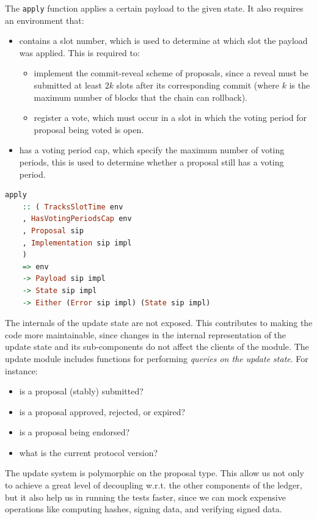 The \lstinline[language=Haskell]!apply! function applies a certain payload to 
the given state. It
also requires an environment that:
\begin{itemize}
	\item contains a slot number, which is used to determine at which slot the
	payload was applied. This is required to:
	\begin{itemize}
		\item implement the commit-reveal scheme of proposals, since a reveal 
		must be
		submitted at least $2k$ slots after its corresponding commit (where $k$ 
		is
		the maximum number of blocks that the chain can rollback).
		\item register a vote, which must occur in a slot in which the voting 
		period
		for proposal being voted is open.
	\end{itemize}
	\item has a voting period cap, which specify the maximum number of voting
	periods, this is used to determine whether a proposal still has a voting
	period.
\end{itemize}

\begin{lstlisting}[language=Haskell]
	apply
	:: ( TracksSlotTime env
	, HasVotingPeriodsCap env
	, Proposal sip
	, Implementation sip impl
	)
	=> env
	-> Payload sip impl
	-> State sip impl
	-> Either (Error sip impl) (State sip impl)
\end{lstlisting}

The internals of the update state are not exposed. This contributes to making
the code more maintainable, since changes in the internal representation of the
update state and its sub-components do not affect the clients of the module.
The update module includes functions for performing \emph{queries on the update
	state}. For instance:
\begin{itemize}
	\item is a proposal (stably) submitted?
	\item is a proposal approved, rejected, or expired?
	\item is a proposal being endorsed?
	\item what is the current protocol version?
\end{itemize}

The update system is polymorphic on the proposal type. This allow us not only
to achieve a great level of decoupling w.r.t. the other components of the
ledger, but it also help us in running the tests faster, since we can mock
expensive operations like computing hashes, signing data, and verifying signed
data.

